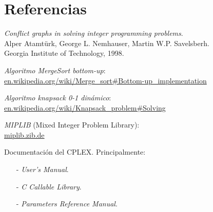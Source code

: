 \section{Referencias}

\begin{enumerate}[ {[}1{]} ]

\item \emph{Conflict graphs in solving integer programming problems}.\\
Alper Atamtürk, George L. Nemhauser, Martin W.P. Savelsberh.\\ 
Georgia Institute of Technology, 1998.

\item \emph{Algoritmo MergeSort bottom-up}:\\
	\url{en.wikipedia.org/wiki/Merge_sort#Bottom-up_implementation}

\item \emph{Algoritmo knapsack 0-1 dinámico}:\\
	\url{en.wikipedia.org/wiki/Knapsack_problem#Solving}

\item \emph{MIPLIB} (Mixed Integer Problem Library):\\
	\url{miplib.zib.de}

\item Documentación del CPLEX. Principalmente: 
		\begin{itemize}
			\item[-] \emph{User's Manual}.
			\item[-] \emph{C Callable Library}.
			\item[-] \emph{Parameters Reference Manual}.
		\end{itemize}

\end{enumerate}
